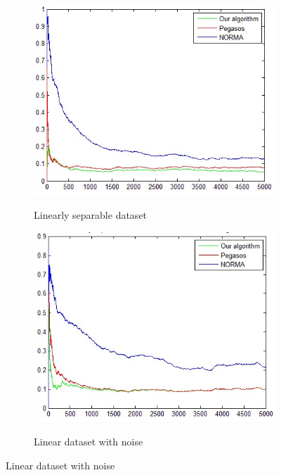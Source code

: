 \begin{figure}[t]
    \centering
\begin{subfigure}[b]{.45\linewidth}
       \includegraphics[width=0.9\linewidth]{PN_Lin_Gauss}
\label{LG}
        \caption{Linearly separable dataset}
      \end{subfigure}%
\hspace{.01\linewidth}
\begin{subfigure}[b]{.45\linewidth}
	 \includegraphics[width=0.9\linewidth]{PN_Noise_Gauss.jpg}
       \label{NG}
      \caption{Linear dataset with noise}
  
	 \end{subfigure}%


\end{figure}
